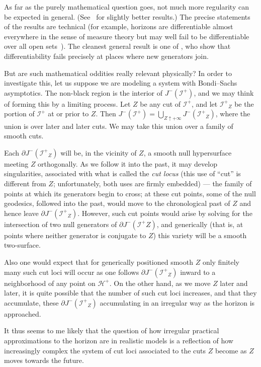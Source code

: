 \documentclass[
%
draft    %
,numberedheadings 
,bibliocites
  ]
  {aipproc}
\newcommand{\scrif}{{{\mathscr I}^{+}}}
\newcommand{\Hf}{{{\mathscr H}^{+}}} %
\begin{document}
As far as the purely mathematical question goes, not much more regularity can be expected in general.  (See~\citet{Chrusciel:2001,Chrusciel:2002} for slightly better results.)  The precise statements of the results are technical (for example, horizons are differentiable almost everywhere in the sense of measure theory but may well fail to be differentiable over all open sets~\citep{Chrusciel:1998}).   The cleanest general result is one of \citet{Beem:1998}, who show that differentiability fails precisely at places where new generators join.

But are such mathematical oddities really relevant physically?  In order to investigate this, let us suppose we are modeling a system with Bondi--Sachs asymptotics. 
The non-black region is the interior of $J^-(\scrif )$, and we may think of forming this by a limiting process.  Let $Z$ be any cut of $\scrif$, and let $\scrif _Z$ be the portion of $\scrif$ at or prior to $Z$.  Then $J^-(\scrif )=\bigcup _{Z\uparrow +\infty} J^-(\scrif _Z)$, where the union is over later and later cuts.   We may take this union over a family of smooth cuts.

Each $\partial J^-(\scrif _Z)$ will be, in the vicinity of $Z$, a smooth null hypersurface meeting $Z$ orthogonally.  As we follow it into the past, it may develop singularities, associated with what is called the {\em cut locus} (this use of ``cut'' is different from $Z$; unfortunately, both uses are firmly embedded) --- the family of points at which its generators begin to cross; at these cut points, some of the null geodesics, followed into the past, would move to the chronological past of $Z$ and hence leave $\partial J^-(\scrif _Z)$.  However, such cut points would arise by solving for the intersection of two null generators of $\partial J^-(\scrif Z)$, and generically (that is, at points where neither generator is conjugate to $Z$) this variety will be a smooth two-surface.  

Also one would expect that for generically positioned smooth $Z$ only finitely many such cut loci will occur as one follows $\partial J^-(\scrif _Z)$ inward to a neighborhood of any point on $\Hf$.  On the other hand, as we move $Z$ later and later, it is quite possible that the number of such cut loci increases, and that they accumulate, these $\partial J^-(\scrif _Z)$ accumulating in an irregular way as the horizon is approached.

It thus seems to me likely that the question of how irregular practical approximations to the horizon are in realistic models is a reflection of how increasingly complex the system of cut loci associated to the cuts $Z$ become as $Z$ moves towards the future.
\end{document}
